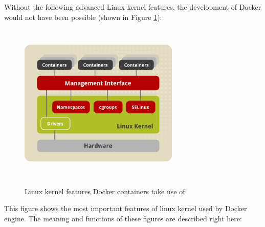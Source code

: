 Without the following advanced Linux kernel features,
the development of Docker would not have been possible
(shown in Figure \ref{fig:DockerLinuxKernelPic}):

\begin{figure}
\includegraphics[height=3in, width=3in]{dockerLinuxKernel}
\caption{Linux kernel features Docker containers take use of}
\cite{DockerLinuxKernelPic}
\label{fig:DockerLinuxKernelPic}
\end{figure}

This figure shows the most important features
of linux kernel used by Docker engine. The meaning and
functions of these figures are described right here:

